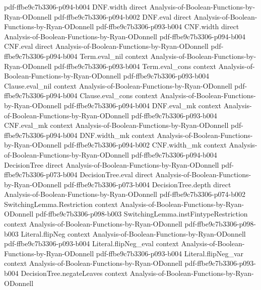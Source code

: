 \begin{theorem}
  {pdf-ffbe9c7b3306-p094-b004}
\proofstep
  {DNF.width}
  {direct}
  {Analysis-of-Boolean-Functions-by-Ryan-ODonnell}
  {pdf-ffbe9c7b3306-p094-b002}
\proofstep
  {DNF.eval}
  {direct}
  {Analysis-of-Boolean-Functions-by-Ryan-ODonnell}
  {pdf-ffbe9c7b3306-p093-b004}
\proofstep
  {CNF.width}
  {direct}
  {Analysis-of-Boolean-Functions-by-Ryan-ODonnell}
  {pdf-ffbe9c7b3306-p094-b004}
\proofstep
  {CNF.eval}
  {direct}
  {Analysis-of-Boolean-Functions-by-Ryan-ODonnell}
  {pdf-ffbe9c7b3306-p094-b004}
\proofstep
  {Term.eval_nil}
  {context}
  {Analysis-of-Boolean-Functions-by-Ryan-ODonnell}
  {pdf-ffbe9c7b3306-p093-b004}
\proofstep
  {Term.eval_cons}
  {context}
  {Analysis-of-Boolean-Functions-by-Ryan-ODonnell}
  {pdf-ffbe9c7b3306-p093-b004}
\proofstep
  {Clause.eval_nil}
  {context}
  {Analysis-of-Boolean-Functions-by-Ryan-ODonnell}
  {pdf-ffbe9c7b3306-p094-b004}
\proofstep
  {Clause.eval_cons}
  {context}
  {Analysis-of-Boolean-Functions-by-Ryan-ODonnell}
  {pdf-ffbe9c7b3306-p094-b004}
\proofstep
  {DNF.eval_mk}
  {context}
  {Analysis-of-Boolean-Functions-by-Ryan-ODonnell}
  {pdf-ffbe9c7b3306-p093-b004}
\proofstep
  {CNF.eval_mk}
  {context}
  {Analysis-of-Boolean-Functions-by-Ryan-ODonnell}
  {pdf-ffbe9c7b3306-p094-b004}
\proofstep
  {DNF.width_mk}
  {context}
  {Analysis-of-Boolean-Functions-by-Ryan-ODonnell}
  {pdf-ffbe9c7b3306-p094-b002}
\proofstep
  {CNF.width_mk}
  {context}
  {Analysis-of-Boolean-Functions-by-Ryan-ODonnell}
  {pdf-ffbe9c7b3306-p094-b004}
\proofstep
  {DecisionTree}
  {direct}
  {Analysis-of-Boolean-Functions-by-Ryan-ODonnell}
  {pdf-ffbe9c7b3306-p073-b004}
\proofstep
  {DecisionTree.eval}
  {direct}
  {Analysis-of-Boolean-Functions-by-Ryan-ODonnell}
  {pdf-ffbe9c7b3306-p073-b004}
\proofstep
  {DecisionTree.depth}
  {direct}
  {Analysis-of-Boolean-Functions-by-Ryan-ODonnell}
  {pdf-ffbe9c7b3306-p074-b002}
\proofstep
  {SwitchingLemma.Restriction}
  {context}
  {Analysis-of-Boolean-Functions-by-Ryan-ODonnell}
  {pdf-ffbe9c7b3306-p098-b003}
\proofstep
  {SwitchingLemma.instFintypeRestriction}
  {context}
  {Analysis-of-Boolean-Functions-by-Ryan-ODonnell}
  {pdf-ffbe9c7b3306-p098-b003}
\proofstep
  {Literal.flipNeg}
  {context}
  {Analysis-of-Boolean-Functions-by-Ryan-ODonnell}
  {pdf-ffbe9c7b3306-p093-b004}
\proofstep
  {Literal.flipNeg_eval}
  {context}
  {Analysis-of-Boolean-Functions-by-Ryan-ODonnell}
  {pdf-ffbe9c7b3306-p093-b004}
\proofstep
  {Literal.flipNeg_var}
  {context}
  {Analysis-of-Boolean-Functions-by-Ryan-ODonnell}
  {pdf-ffbe9c7b3306-p093-b004}
\proofstep
  {DecisionTree.negateLeaves}
  {context}
  {Analysis-of-Boolean-Functions-by-Ryan-ODonnell}

\end{theorem}
